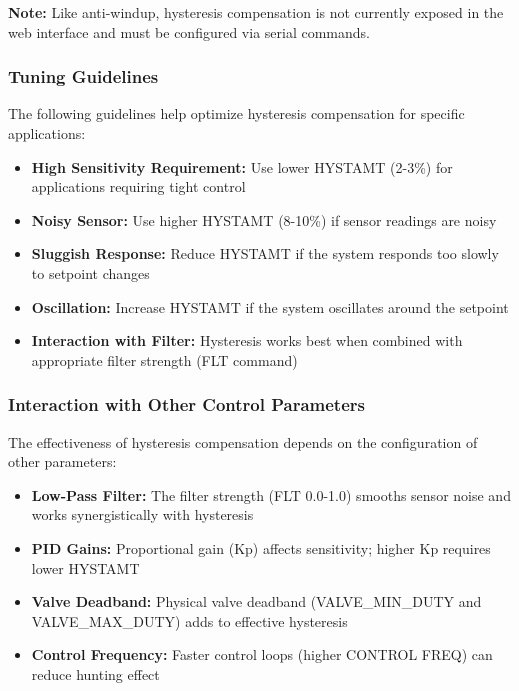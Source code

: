 \textbf{Note:} Like anti-windup, hysteresis compensation is not currently exposed in the web interface and must be configured via serial commands.

\subsubsection{Tuning Guidelines}

The following guidelines help optimize hysteresis compensation for specific applications:

\begin{itemize}
    \item \textbf{High Sensitivity Requirement:} Use lower HYSTAMT (2-3\%) for applications requiring tight control
    \item \textbf{Noisy Sensor:} Use higher HYSTAMT (8-10\%) if sensor readings are noisy
    \item \textbf{Sluggish Response:} Reduce HYSTAMT if the system responds too slowly to setpoint changes
    \item \textbf{Oscillation:} Increase HYSTAMT if the system oscillates around the setpoint
    \item \textbf{Interaction with Filter:} Hysteresis works best when combined with appropriate filter strength (FLT command)
\end{itemize}

\subsubsection{Interaction with Other Control Parameters}

The effectiveness of hysteresis compensation depends on the configuration of other parameters:

\begin{itemize}
    \item \textbf{Low-Pass Filter:} The filter strength (FLT 0.0-1.0) smooths sensor noise and works synergistically with hysteresis
    \item \textbf{PID Gains:} Proportional gain (Kp) affects sensitivity; higher Kp requires lower HYSTAMT
    \item \textbf{Valve Deadband:} Physical valve deadband (VALVE\_MIN\_DUTY and VALVE\_MAX\_DUTY) adds to effective hysteresis
    \item \textbf{Control Frequency:} Faster control loops (higher CONTROL FREQ) can reduce hunting effect
\end{itemize}

